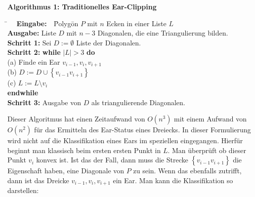 \begin{flushleft}
  { \textbf{Algorithmus 1: Traditionelles Ear-Clipping} \cite{improvedeca}
        \begin{tabbing}
          \=$~~~~~~$\= \textbf{Eingabe:} $~~~$\= Polyg\=on $P$ mit $n$ Ecken in einer Liste $L$\\
          \> \> \textbf{Ausgabe:} \> Liste $D$ mit $n-3$ Diagonalen, die eine Triangulierung bilden.\\
          \> \> \textbf{Schritt 1:} \>Sei $D := \emptyset$ Liste der Diagonalen.\\
          \> \> \textbf{Schritt 2:} \>\textbf{while} $|L| > 3$ \textbf{do}\\
          \> \>                     \> \> (a) Finde ein Ear $v_{i-1}, v_i, v_{i+1}$\\
          \> \>                     \> \> (b) $D := D \cup \left\{v_{i-1} v_{i+1}\right\}$\\
          \> \>                     \> \> (c) $L := L\setminus v_i$\\
          \> \> \> \textbf{endwhile}\\
          \> \> \textbf{Schritt 3:} \> Ausgabe von $D$ als triangulierende Diagonalen.
        \end{tabbing}
}
\end{flushleft}

Dieser Algoritmus hat einen Zeitaufwand von $O(n^3)$ mit einem Aufwand von $O(n^2)$ für das Ermitteln des Ear-Status eines Dreiecks. 
In dieser Formulierung wird nicht auf die Klassifikation eines Ears im speziellen eingegangen. Hierfür beginnt man klassisch 
beim ersten ersten Punkt in $L$. Man überprüft ob dieser Punkt $v_i$ konvex ist. Ist das der Fall, dann muss die Strecke $\left\{v_{i-1}v_{i+1}\right\}$ die Eigenschaft haben, 
eine Diagonale von $P$ zu sein. Wenn das ebenfalls zutrifft, dann ist das Dreicke $v_{i-1}, v_i, v_{i+1}$ ein Ear. 
Man kann die Klassifikation so darstellen:

